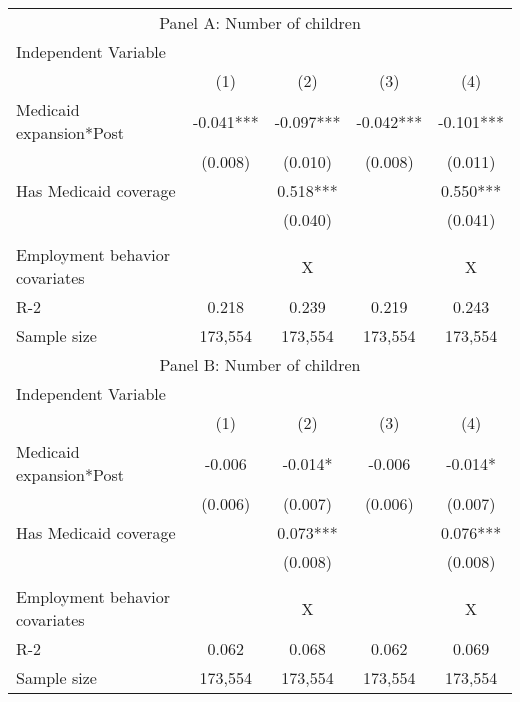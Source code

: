 \begin{tabular}{lcccc}
\toprule
\toprule
 \multicolumn{5}{c}{Panel A: Number of children } \\
 Independent Variable & & & &  \\
  & (1) & (2) & (3) &  (4) \\
\midrule 
 Medicaid expansion*Post   & -0.041***   & -0.097***   & -0.042***   & -0.101***  \\
 & (0.008)   & (0.010)   & (0.008)   & (0.011)  \\
 Has Medicaid coverage   &   & 0.518***   &   & 0.550***  \\
 &    & (0.040)   &    & (0.041)  \\
\\
Employment behavior covariates  &  & X &  & X \\
R-2 & 0.218 & 0.239 & 0.219 & 0.243 \\
Sample size & 173,554 & 173,554 & 173,554 & 173,554 \\
\midrule
\midrule
 \multicolumn{5}{c}{Panel B: Number of children } \\
 Independent Variable & & & &  \\
  & (1) & (2) & (3) &  (4) \\
\midrule 
 Medicaid expansion*Post   & -0.006   & -0.014*   & -0.006   & -0.014*  \\
 & (0.006)   & (0.007)   & (0.006)   & (0.007)  \\
 Has Medicaid coverage   &   & 0.073***   &   & 0.076***  \\
 &    & (0.008)   &    & (0.008)  \\
\\
Employment behavior covariates  &  & X &  & X \\
R-2 & 0.062 & 0.068 & 0.062 & 0.069 \\
Sample size & 173,554 & 173,554 & 173,554 & 173,554 \\
\midrule
\midrule
\bottomrule
\end{tabular}